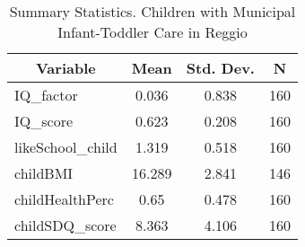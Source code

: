 
\begin{table}[htbp]\centering \caption{Summary Statistics. Children with Municipal Infant-Toddler Care in Reggio \label{bothChildasiloMuniReggio}}
\begin{tabular}{l c c  c}\hline\hline
\multicolumn{1}{c}{\textbf{Variable}} & \textbf{Mean}
 & \textbf{Std. Dev.} & \textbf{N}\\ \hline
IQ\_factor & 0.036 & 0.838  & 160\\
IQ\_score & 0.623 & 0.208  & 160\\
likeSchool\_child & 1.319 & 0.518  & 160\\
childBMI & 16.289 & 2.841  & 146\\
childHealthPerc & 0.65 & 0.478  & 160\\
childSDQ\_score & 8.363 & 4.106  & 160\\
\hline\end{tabular}
\end{table}
